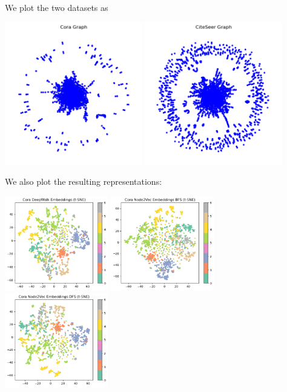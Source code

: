 \documentclass[11pt]{scrartcl}
\begin{document}
We plot the two datasets as \begin{center}
    \includegraphics[width=6cm]{hw1-img/hw1-p5-1.png}
    \includegraphics[width=6cm]{hw1-img/hw1-p5-2.png}
\end{center}
We also plot the resulting representations: \begin{center}
    \includegraphics[width=4.5cm]{hw1-img/hw1-p5-3.png}
    \includegraphics[width=4.5cm]{hw1-img/hw1-p5-4.png}
    \includegraphics[width=4.5cm]{hw1-img/hw1-p5-5.png}
\end{center}
\end{document}
